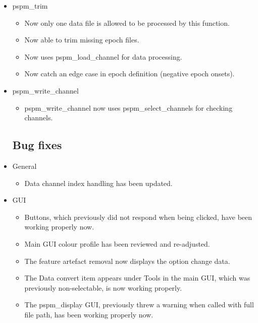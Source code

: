 \documentclass[english]{article}
\numberwithin{equation}{section}
\numberwithin{figure}{section}
\begin{document}
\begin{itemize}
\item pspm\_trim

\begin{itemize}
\item Now only one data file is allowed to be processed by this function.

\item Now able to trim missing epoch files.

\item Now uses pspm\_load\_channel for data processing.

\item Now catch an edge case in epoch definition (negative epoch onsets).
\end{itemize}

\item pspm\_write\_channel

\begin{itemize}
\item pspm\_write\_channel now uses pspm\_select\_channels for checking channels.
\end{itemize}

\subsection*{Bug fixes}

\item General

\begin{itemize}
\item Data channel index handling has been updated.
\end{itemize}

\item GUI

\begin{itemize}
\item Buttons, which previously did not respond when being clicked, have been working properly now.

\item Main GUI colour profile has been reviewed and re-adjusted.

\item The feature artefact removal now displays the option change data.

\item The Data convert item appears under Tools in the main GUI, which was previously non-selectable, is now working properly.

\item The pspm\_display GUI, previously threw a warning when called with full file path, has been working properly now.


\end{itemize}
\end{itemize}
\end{document}
